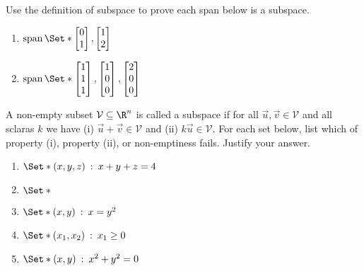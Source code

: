 \begin{exercises}
\begin{problist}
\begin{solution}
		\end{solution}
		
		\prob Use the definition of subspace to prove each span below is a subspace.
		\begin{enumerate}
			\item $\Span\Set*{\mat{0\\1}, \mat{1\\2}}$
			\item $\Span\Set*{\mat{1\\1\\1}, \mat{1\\0\\0}, \mat{2\\0\\0}}$
		\end{enumerate}
		\begin{solution}
		
		\end{solution}
		
		\prob
		A non-empty subset $\mathcal V \subseteq \R^n$ is called a subspace if
		for all $\vec u, \vec v \in \mathcal V$ and all sclaras $k$ we have
			(i) $\vec u + \vec v \in \mathcal V$ and
			(ii) $k\vec u \in \mathcal V$.
			For each set below, list which of property (i), property (ii), or non-emptiness fails.
			Justify your answer.
		\begin{enumerate}
			\item $\Set*{(x,y,z)\given x+y+z=4}$
			\item $\Set*{}$
			\item $\Set*{(x,y)\given x=y^2}$
			\item $\Set*{(x_1,x_2)\given x_1 \geq 0}$
			\item $\Set*{(x,y)\given x^2+y^2=0}$
		\end{enumerate}
		\begin{solution}
		
		\end{solution}
		

\end{problist}
\end{exercises}
